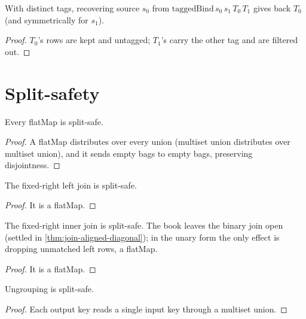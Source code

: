 \begin{theorem}
  \label{thm:tagged-inverse}\leanok
  With distinct tags, recovering source $s_0$ from
  $\mathrm{taggedBind}\,s_0\,s_1\,T_0\,T_1$ gives back $T_0$ (and
  symmetrically for $s_1$).
\end{theorem}
\begin{proof}\leanok
  $T_0$'s rows are kept and untagged; $T_1$'s carry the other tag and
  are filtered out.
\end{proof}

\chapter{Split-safety}

\begin{theorem}
  \label{thm:flatMap-splitsafe}\leanok
  Every flatMap is split-safe.
\end{theorem}
\begin{proof}\leanok
  A flatMap distributes over every union (multiset union distributes over
  multiset union), and it sends empty bags to empty bags, preserving
  disjointness.
\end{proof}

\begin{theorem}
  \label{thm:leftjoin-splitsafe}\leanok
  The fixed-right left join is split-safe.
\end{theorem}
\begin{proof}\leanok
  It is a flatMap.
\end{proof}

\begin{theorem}
  \label{thm:innerjoin-splitsafe}\leanok
  The fixed-right inner join is split-safe.  The book leaves the binary
  join open (settled in \ref{thm:join-aligned-diagonal}); in the unary form the only
  effect is dropping unmatched left rows, a flatMap.
\end{theorem}
\begin{proof}\leanok
  It is a flatMap.
\end{proof}

\begin{theorem}
  \label{thm:promote-splitsafe}\leanok
  Ungrouping is split-safe.
\end{theorem}
\begin{proof}\leanok
  Each output key reads a single input key through a multiset union.
\end{proof}

